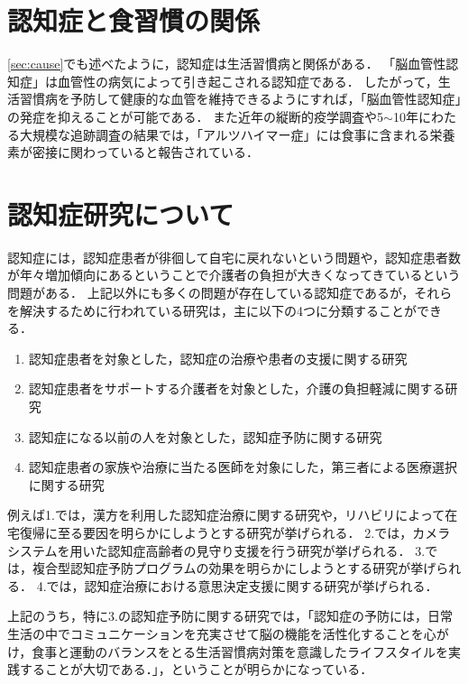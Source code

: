 \documentclass[../report]{subfiles}
\begin{document}
\section{認知症と食習慣の関係}
\ref{sec:cause}でも述べたように，認知症は生活習慣病と関係がある．
「脳血管性認知症」は血管性の病気によって引き起こされる認知症である．
したがって，生活習慣病を予防して健康的な血管を維持できるようにすれば，「脳血管性認知症」の発症を抑えることが可能である．
また近年の縦断的疫学調査や5$\sim$10年にわたる大規模な追跡調査の結果では，「アルツハイマー症」には食事に含まれる栄養素が密接に関わっていると報告されている\cite{nutrition-dementia-00}\cite{nutrition-dementia-01}．


\section{認知症研究について}
認知症には，認知症患者が徘徊して自宅に戻れないという問題や，認知症患者数が年々増加傾向にあるということで介護者の負担が大きくなってきているという問題がある．
上記以外にも多くの問題が存在している認知症であるが，それらを解決するために行われている研究は，主に以下の4つに分類することができる．

\begin{enumerate}
    \item 認知症患者を対象とした，認知症の治療や患者の支援に関する研究
    \item 認知症患者をサポートする介護者を対象とした，介護の負担軽減に関する研究
    \item 認知症になる以前の人を対象とした，認知症予防に関する研究
    \item 認知症患者の家族や治療に当たる医師を対象にした，第三者による医療選択に関する研究
\end{enumerate}

例えば1.では，漢方を利用した認知症治療に関する研究\cite{dementia-prevention-with-chinese-medicine}や，リハビリによって在宅復帰に至る要因を明らかにしようとする研究\cite{rehabilitation}が挙げられる．
2.では，カメラシステムを用いた認知症高齢者の見守り支援を行う研究\cite{camera-system}が挙げられる．
3.では，複合型認知症予防プログラムの効果を明らかにしようとする研究\cite{dementia-prevention-with-some-programs}が挙げられる．
4.では，認知症治療における意思決定支援に関する研究\cite{medical-choice}が挙げられる．

上記のうち，特に3.の認知症予防に関する研究では，「認知症の予防には，日常生活の中でコミュニケーションを充実させて脳の機能を活性化することを心がけ，食事と運動のバランスをとる生活習慣病対策を意識したライフスタイルを実践することが大切である．」\cite{dementia-prevention}，ということが明らかになっている．
\end{document}
